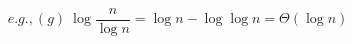 \documentclass{article}
\begin{document}
\begin{equation*}
e.g., (g) \ \log{\frac{n}{\log n}} = \log n - \log \log n = \Theta(\log n)
\end{equation*}
\end{document}
